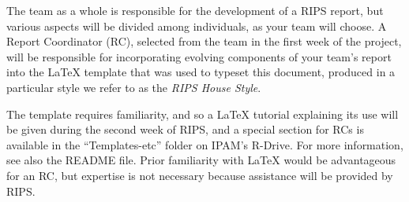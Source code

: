 The team as a whole is responsible for the development of a RIPS report, but various aspects will be divided among individuals, as your team will choose.
A Report Coordinator (RC), selected from the team in the first week of the project, will be responsible for incorporating evolving components of your team's report into the {\LaTeX} template that was used to typeset this document, produced in a particular style we refer to as the {\it RIPS  House Style}.

The template requires familiarity, and so a {\LaTeX} tutorial explaining its use  will be given during the second week of RIPS, and a special section for RCs is available in the ``Templates-etc'' folder on IPAM's R-Drive.
For more information, see  also the  README file.
Prior familiarity with {\LaTeX}  would be advantageous for an RC, but expertise is not necessary because assistance will be provided by RIPS.


\endinput
